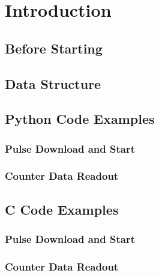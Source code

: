 

\chapter{Introduction}
 
\section{Before Starting}


\section{Data Structure}


\section{Python Code Examples}
\subsection{Pulse Download and Start}
\subsection{Counter Data Readout}



\section{C Code Examples}
\subsection{Pulse Download and Start}
\subsection{Counter Data Readout}

